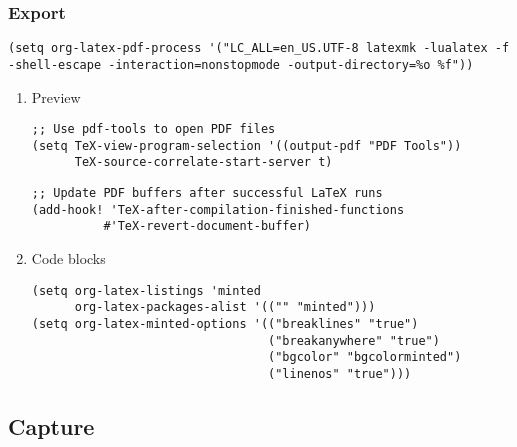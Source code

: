 \documentclass[c]{article}
\theoremstyle{plain}%
\theoremstyle{definition}
\theoremstyle{remark}
\begin{document}
\subsubsection{Export}
\label{sec:orge1f6834}
\begin{verbatim}
(setq org-latex-pdf-process '("LC_ALL=en_US.UTF-8 latexmk -lualatex -f  -shell-escape -interaction=nonstopmode -output-directory=%o %f"))
\end{verbatim}
\begin{enumerate}
\item Preview
\label{sec:orgd4ad207}
\begin{verbatim}
;; Use pdf-tools to open PDF files
(setq TeX-view-program-selection '((output-pdf "PDF Tools"))
      TeX-source-correlate-start-server t)
\end{verbatim}
\begin{verbatim}
;; Update PDF buffers after successful LaTeX runs
(add-hook! 'TeX-after-compilation-finished-functions
          #'TeX-revert-document-buffer)
\end{verbatim}
\item Code blocks
\label{sec:orge52cb7f}
\begin{verbatim}
(setq org-latex-listings 'minted
      org-latex-packages-alist '(("" "minted")))
(setq org-latex-minted-options '(("breaklines" "true")
                                 ("breakanywhere" "true")
                                 ("bgcolor" "bgcolorminted")
                                 ("linenos" "true")))
\end{verbatim}
\end{enumerate}
\subsection{Capture}
\label{sec:org011b73c}
\end{document}
